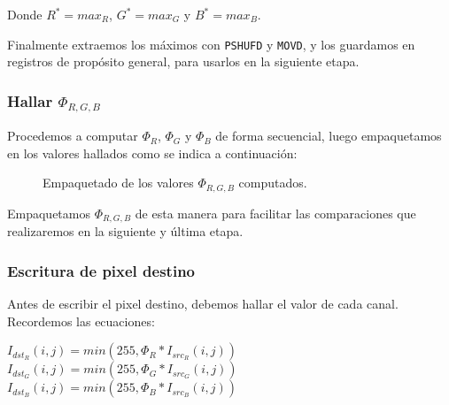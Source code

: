 Donde $R^\ast = max_R$, $G^\ast = max_G$ y $B^\ast = max_B$.

Finalmente extraemos los máximos con \texttt{PSHUFD} y \texttt{MOVD},
y los guardamos en registros de propósito general, para usarlos en la
siguiente etapa.




\subsubsection{Hallar $\Phi_{R,G,B}$}

Procedemos a computar $\Phi_R$, $\Phi_G$ y $\Phi_B$ de forma secuencial,
luego empaquetamos en  los valores hallados como se indica a continuación:

\begin{figure}[H]
    \centering
    \caption{Empaquetado de los valores $\Phi_{R,G,B}$ computados.}
\end{figure}

Empaquetamos $\Phi_{R,G,B}$ de esta manera para facilitar las
comparaciones que realizaremos en la siguiente y última etapa.




\subsubsection{Escritura de pixel destino}

Antes de escribir el pixel destino, debemos hallar el valor de cada canal.
Recordemos las ecuaciones:

\begin{center}
    $I_{dst_R}(i, j) = min(255, \Phi_R \ast I_{src_R}(i, j))$ \\
    $I_{dst_G}(i, j) = min(255, \Phi_G \ast I_{src_G}(i, j))$ \\
    $I_{dst_B}(i, j) = min(255, \Phi_B \ast I_{src_B}(i, j))$
\end{center}

